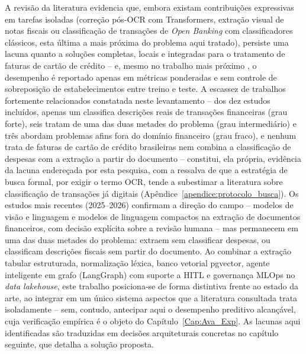 A revisão da literatura evidencia que, embora existam contribuições expressivas em tarefas isoladas (correção pós-OCR com Transformers, extração visual de notas fiscais ou classificação de transações de \textit{Open Banking} com classificadores clássicos, esta última a mais próxima do problema aqui tratado), persiste uma lacuna quanto a soluções completas, locais e integradas para o tratamento de faturas de cartão de crédito -- e, mesmo no trabalho mais próximo \cite{ta2023specialized}, o desempenho é reportado apenas em métricas ponderadas e sem controle de sobreposição de estabelecimentos entre treino e teste. A escassez de trabalhos fortemente relacionados constatada neste levantamento -- dos dez estudos incluídos, apenas um classifica descrições reais de transações financeiras (grau forte), seis tratam de uma das duas metades do problema (grau intermediário) e três abordam problemas afins fora do domínio financeiro (grau fraco), e nenhum trata de faturas de cartão de crédito brasileiras nem combina a classificação de despesas com a extração a partir do documento -- constitui, ela própria, evidência da lacuna endereçada por esta pesquisa, com a ressalva de que a estratégia de busca formal, por exigir o termo OCR, tende a subestimar a literatura sobre classificação de transações já digitais (Apêndice~\ref{apendice:protocolo_busca}). Os estudos mais recentes (2025--2026) confirmam a direção do campo -- modelos de visão e linguagem e modelos de linguagem compactos na extração de documentos financeiros, com decisão explícita sobre a revisão humana -- mas permanecem em uma das duas metades do problema: extraem sem classificar despesas, ou classificam descrições fiscais sem partir do documento. Ao combinar a extração tabular estruturada, normalização léxica, banco vetorial pgvector, agente inteligente em grafo (LangGraph) com suporte a HITL e governança MLOps no \textit{data lakehouse}, este trabalho posiciona-se de forma distintiva frente ao estado da arte, ao integrar em um único sistema aspectos que a literatura consultada trata isoladamente -- sem, contudo, antecipar aqui o desempenho preditivo alcançável, cuja verificação empírica é o objeto do Capítulo~\ref{Cap:Ava_Exp}. As lacunas aqui identificadas são traduzidas em decisões arquiteturais concretas no capítulo seguinte, que detalha a solução proposta.
